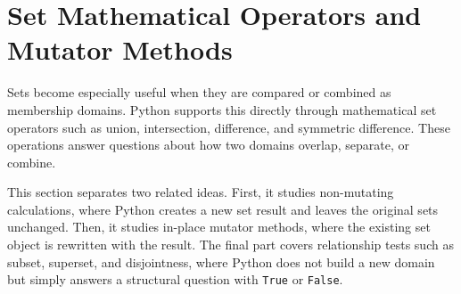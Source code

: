 \section{Set Mathematical Operators and Mutator Methods}

Sets become especially useful when they are compared or combined as membership domains. Python supports this directly through mathematical set operators such as union, intersection, difference, and symmetric difference. These operations answer questions about how two domains overlap, separate, or combine.

This section separates two related ideas. First, it studies non-mutating calculations, where Python creates a new set result and leaves the original sets unchanged. Then, it studies in-place mutator methods, where the existing set object is rewritten with the result. The final part covers relationship tests such as subset, superset, and disjointness, where Python does not build a new domain but simply answers a structural question with \texttt{True} or \texttt{False}.